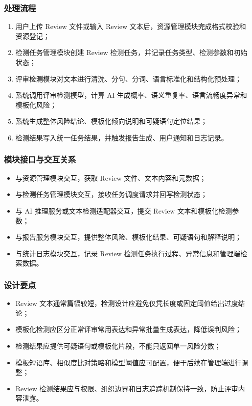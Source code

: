 \subsubsection{处理流程}
\begin{enumerate}[leftmargin=2em]
    \item 用户上传 Review 文件或输入 Review 文本后，资源管理模块完成格式校验和资源登记；
    \item 检测任务管理模块创建 Review 检测任务，并记录任务类型、检测参数和初始状态；
    \item 评审检测模块对文本进行清洗、分句、分词、语言标准化和结构化预处理；
    \item 系统调用评审检测模型，计算 AI 生成概率、语义重复率、语言流畅度异常和模板化风险；
    \item 系统生成整体风险结论、模板化倾向说明和可疑语句定位结果；
    \item 检测结果写入统一任务结果，并触发报告生成、用户通知和日志记录。
\end{enumerate}

\subsubsection{模块接口与交互关系}
\begin{itemize}[leftmargin=2em]
    \item 与资源管理模块交互，获取 Review 文件、文本内容和元数据；
    \item 与检测任务管理模块交互，接收任务调度请求并回写检测状态；
    \item 与 AI 推理服务或文本检测适配器交互，提交 Review 文本和模板化检测参数；
    \item 与报告服务模块交互，提供整体风险、模板化结果、可疑语句和解释说明；
    \item 与统计日志模块交互，记录 Review 检测任务执行过程、异常信息和管理端检索数据。
\end{itemize}

\subsubsection{设计要点}
\begin{itemize}[leftmargin=2em]
    \item Review 文本通常篇幅较短，检测设计应避免仅凭长度或固定阈值给出过度结论；
    \item 模板化检测应区分正常评审常用表达和异常批量生成表达，降低误判风险；
    \item 检测结果应提供可疑语句或模板化片段，不能只返回单一风险分数；
    \item 模板短语库、相似度比对策略和模型阈值应可配置，便于后续在管理端进行调整；
    \item Review 检测结果应与权限、组织边界和日志追踪机制保持一致，防止评审内容泄露。
\end{itemize}

